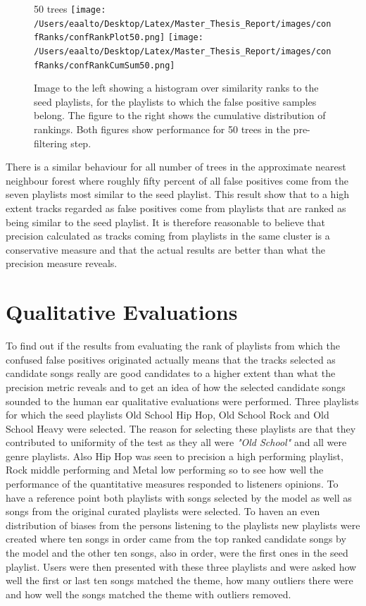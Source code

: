 \documentclass[a4paper,11pt]{kth-mag}
\begin{document}
\begin{figure}
50 trees
\texttt{[image: /Users/eaalto/Desktop/Latex/Master\_Thesis\_Report/images/confRanks/confRankPlot50.png]}
\texttt{[image: /Users/eaalto/Desktop/Latex/Master\_Thesis\_Report/images/confRanks/confRankCumSum50.png]}
\caption{Image to the left showing a histogram over similarity ranks to the seed playlists, for the playlists to which the false positive samples belong. The figure to the right shows the cumulative distribution of rankings. Both figures show performance for 50 trees in the pre-filtering step.}
\end{figure}

There is a similar behaviour for all number of trees in the approximate nearest neighbour forest where roughly fifty percent of all false positives come from the seven playlists most similar to the seed playlist. This result show that to a high extent tracks regarded as false positives come from playlists that are ranked as being similar to the seed playlist. It is therefore reasonable to believe that precision calculated as tracks coming from playlists in the same cluster is a conservative measure and that the actual results are better than what the precision measure reveals.

\section{Qualitative Evaluations}
To find out if the results from evaluating the rank of playlists from which the confused false positives originated actually means that the tracks selected as candidate songs really are good candidates to a higher extent than what the precision metric reveals and to get an idea of how the selected candidate songs sounded to the human ear qualitative evaluations were performed. Three playlists for which the seed playlists Old School Hip Hop, Old School Rock and Old School Heavy were selected. The reason for selecting these playlists are that they contributed to uniformity of the test as they all were \textit{"Old School"} and all were genre playlists. Also Hip Hop was seen to precision a high performing playlist, Rock middle performing and Metal low performing so to see how well the performance of the quantitative measures responded to listeners opinions. To have a reference point both playlists with songs selected by the model as well as songs from the original curated playlists were selected. To haven an even distribution of biases from the persons listening to the playlists new playlists were created where ten songs in order came from the top ranked candidate songs by the model and the other ten songs, also in order, were the first ones in the seed playlist. Users were then presented with these three playlists and were asked how well the first or last ten songs matched the theme, how many outliers there were and how well the songs matched the theme with outliers removed.
\end{document}
